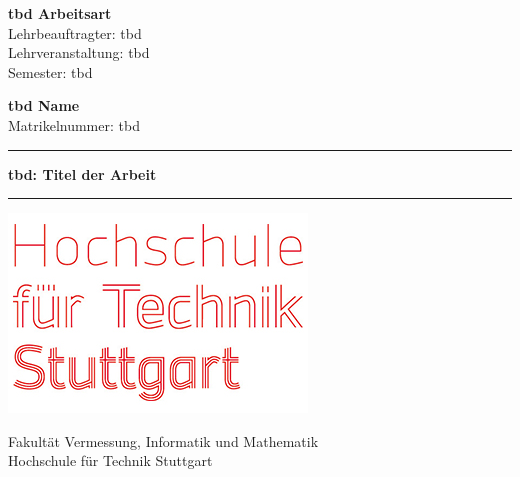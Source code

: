 \begin{titlepage}
    \begin{center}
        \vspace*{1cm}

        \textbf{tbd Arbeitsart}\\
        Lehrbeauftragter: tbd\\
        Lehrveranstaltung: tbd\\
        Semester: tbd


        \vspace{2cm}

        \textbf{tbd Name} \\
        Matrikelnummer: tbd
        
        \vspace{3cm}
        \rule[0.3cm]{\textwidth}{0.4pt}
        \begin{large}
        \textbf{ tbd: Titel der Arbeit }
        \end{large}
        \rule{\textwidth}{0.4pt}
        \vspace{3cm}

        \includegraphics[scale=0.5]{images/hft-logo.jpg}
        

        Fakultät Vermessung, Informatik und Mathematik\\
        Hochschule für Technik Stuttgart\\

    \end{center}   
\end{titlepage}